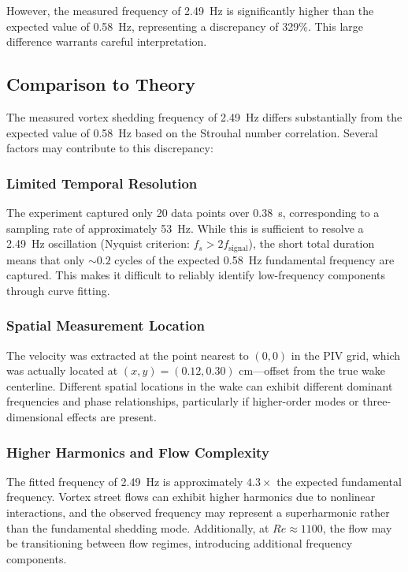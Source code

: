 However, the measured frequency of \SI{2.49}{\hertz} is significantly higher than the expected value of \SI{0.58}{\hertz}, representing a discrepancy of 329\%. This large difference warrants careful interpretation.

\subsection{Comparison to Theory} \label{sec:analysis/theory-comparison}

The measured vortex shedding frequency of \SI{2.49}{\hertz} differs substantially from the expected value of \SI{0.58}{\hertz} based on the Strouhal number correlation. Several factors may contribute to this discrepancy:

\subsubsection{Limited Temporal Resolution}
The experiment captured only 20 data points over \SI{0.38}{\second}, corresponding to a sampling rate of approximately \SI{53}{\hertz}. While this is sufficient to resolve a \SI{2.49}{\hertz} oscillation (Nyquist criterion: \(f_s > 2f_{\text{signal}}\)), the short total duration means that only \(\sim0.2\) cycles of the expected \SI{0.58}{\hertz} fundamental frequency are captured. This makes it difficult to reliably identify low-frequency components through curve fitting.

\subsubsection{Spatial Measurement Location}

The velocity was extracted at the point nearest to \((0,0)\) in the PIV grid, which was actually located at \((x, y) = (0.12, 0.30)\) cm---offset from the true wake centerline. Different spatial locations in the wake can exhibit different dominant frequencies and phase relationships, particularly if higher-order modes or three-dimensional effects are present.

\subsubsection{Higher Harmonics and Flow Complexity}

The fitted frequency of \SI{2.49}{\hertz} is approximately \(4.3 \times\) the expected fundamental frequency. Vortex street flows can exhibit higher harmonics due to nonlinear interactions, and the observed frequency may represent a superharmonic rather than the fundamental shedding mode. Additionally, at \(Re \approx 1100\), the flow may be transitioning between flow regimes, introducing additional frequency components.


